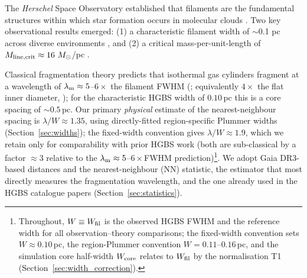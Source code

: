 \documentclass[usenatbib,twoside,twocolumn]{mnras}
\begin{document}
The \textit{Herschel} Space Observatory established that filaments are the fundamental structures within which star formation occurs in molecular clouds \citep{Andre2010}. Two key observational results emerged: (1) a characteristic filament width of $\sim$0.1 pc across diverse environments \citep{Arzoumanian2011}, and (2) a critical mass-per-unit-length of $M_{\rm line,crit} \approx 16~M_\odot$/pc \citep{Ostriker1964}.

Classical fragmentation theory \citep{Inutsuka1992} predicts that isothermal gas cylinders fragment at a wavelength of $\lambda_{\rm m}\approx5$--$6\times$ the filament FWHM (\citealt{Fischera2012}; equivalently $4\times$ the flat inner diameter, \citealt{Inutsuka1992}); for the characteristic HGBS width of $0.10$\,pc this is a core spacing of $\sim0.5$\,pc. Our primary \emph{physical} estimate of the nearest-neighbour spacing is $\lambda/W\approx1.35$, using directly-fitted region-specific Plummer widths (Section~\ref{sec:widths}); the fixed-width convention gives $\lambda/W\approx1.9$, which we retain only for comparability with prior HGBS work (both are sub-classical by a factor $\approx3$ relative to the $\lambda_{\rm m}\approx5$--$6\times$FWHM prediction)\footnote{Throughout, $W\equiv W_{\rm fil}$ is the observed HGBS FWHM and the reference width for all observation--theory comparisons; the fixed-width convention sets $W\approx0.10$\,pc, the region-Plummer convention $W=0.11$--$0.16$\,pc, and the simulation core half-width $W_{\rm core}$ relates to $W_{\rm fil}$ by the normalisation T1 (Section~\ref{sec:width_correction}).}. We adopt Gaia DR3-based distances \citep{Zhang2023} and the nearest-neighbour (NN) statistic, the estimator that most directly measures the fragmentation wavelength, and the one already used in the HGBS catalogue papers \citep{Konyves2015,Konyves2020} (Section~\ref{sec:statistics}).
\end{document}
